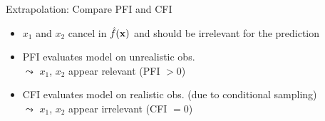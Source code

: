 \documentclass[10pt,compress,t,notes=noshow, xcolor=table]{beamer}
\begin{document}
\begin{frame}{Extrapolation: Compare PFI and CFI }
\begin{itemize}
    \item $x_1$ and $x_2$ cancel in $\hat{f}(\mathbf{x})$ and should be irrelevant for the prediction
    \item PFI evaluates model on unrealistic obs. \\$\leadsto$ $x_1$, $x_2$ appear relevant (PFI $> 0$) 
    \item CFI evaluates model on realistic obs. (due to conditional sampling) \\
$\leadsto$ $x_1$, $x_2$ appear irrelevant (CFI $= 0$)
\end{itemize}

 \end{frame}


\endlecture
\end{document}

